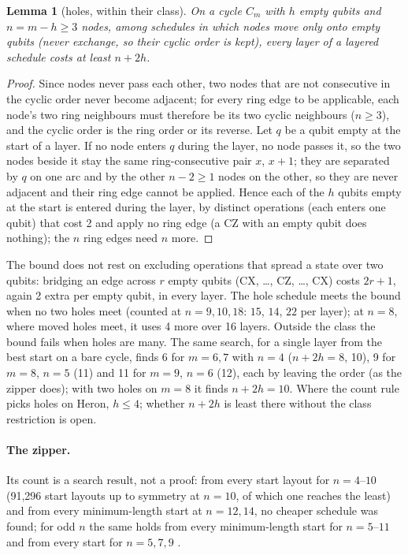 \documentclass[11pt]{article}
\newtheorem{lemma}{Lemma}
\begin{document}
\begin{lemma}[holes, within their class]
On a cycle $C_m$ with $h$ empty qubits and $n = m-h \ge 3$ nodes, among schedules in which nodes move only onto empty
qubits (never exchange, so their cyclic order is kept), every layer of a layered schedule costs at least $n + 2h$.
\end{lemma}
\begin{proof}
Since nodes never pass each other, two nodes that are not consecutive in the cyclic order never become adjacent; for
every ring edge to be applicable, each node's two ring neighbours must therefore be its two cyclic neighbours ($n \ge
3$), and the cyclic order is the ring order or its reverse. Let $q$ be a qubit empty at the start of a layer. If no node
enters $q$ during the layer, no node passes it, so the two nodes beside it stay the same ring-consecutive pair $x$,
$x+1$; they are separated by $q$
on one arc and by the other $n-2 \ge 1$ nodes on the other, so they are never adjacent and their ring edge cannot be
applied. Hence each of the $h$ qubits empty at the start is entered during the layer, by distinct operations (each
enters one qubit) that cost 2 and apply no ring edge (a CZ with an empty qubit does nothing); the $n$ ring edges need
$n$ more.
\end{proof}
\noindent The bound does not rest on excluding operations that spread a state over two qubits: bridging an edge across
$r$ empty qubits (CX, \dots, CZ, \dots, CX) costs $2r + 1$, again 2 extra per empty qubit, in every layer.
\noindent The hole schedule meets the bound when no two holes meet (counted at $n = 9, 10, 18$: $15$, $14$, $22$ per
layer); at $n = 8$, where moved holes meet, it uses 4 more over 16 layers. Outside the class the bound fails when holes
are many. The same search, for a single layer from the best start on a bare cycle, finds 6 for $m = 6, 7$ with
$n = 4$ ($n + 2h = 8$, 10), 9 for $m = 8$, $n = 5$ (11) and 11 for $m = 9$, $n = 6$ (12), each by leaving the order (as
the zipper does); with two holes on $m = 8$ it finds $n + 2h = 10$. Where the count rule picks holes on Heron, $h \le 4$; whether $n + 2h$ is least there without the
class restriction is open.

\paragraph{The zipper.} Its count is a search result, not a proof: from every start layout for $n = 4$--$10$ (91,296
start layouts up to symmetry at $n = 10$, of which one reaches the least) and from every minimum-length start at
$n = 12, 14$, no cheaper schedule was found; for odd $n$ the same holds from every minimum-length start for
$n = 5$--$11$ and from every start for $n = 5, 7, 9$ \cite{toqb}.
\end{document}
